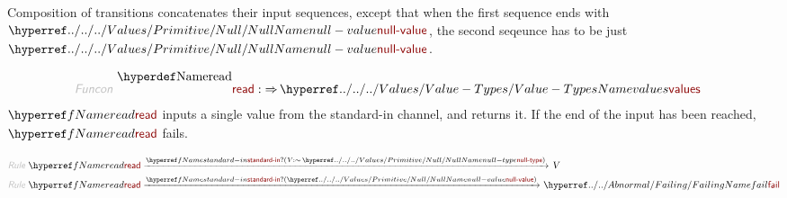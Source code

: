 Composition of transitions concatenates their input sequences, except that
  when the first sequence ends with $\SHADE{\NAMEHYPER{../../../Values/Primitive}{Null}{null-value}}$, the second seqeunce has to be
  just $\SHADE{\NAMEHYPER{../../../Values/Primitive}{Null}{null-value}}$.

\begin{align*}
  \KEY{Funcon} ~ 
  & \NAMEDECL{read} :  \TO \NAMEHYPER{../../../Values}{Value-Types}{values}
\end{align*}
$\SHADE{\NAMEREF{read}}$ inputs a single value from the standard-in channel, and returns it.
  If the end of the input has been reached, $\SHADE{\NAMEREF{read}}$ fails.

\begin{align*}
  \KEY{Rule} ~ 
    &  \NAMEREF{read} \xrightarrow{\NAMEREF{standard-in}?( \VAR{V} : \mathop{\sim} \NAMEHYPER{../../../Values/Primitive}{Null}{null-type} )}_{} 
        \VAR{V}
\\
  \KEY{Rule} ~ 
    &  \NAMEREF{read} \xrightarrow{\NAMEREF{standard-in}?( \NAMEHYPER{../../../Values/Primitive}{Null}{null-value} )}_{} 
        \NAMEHYPER{../../Abnormal}{Failing}{fail}
\end{align*}
